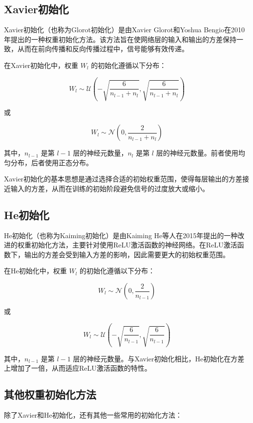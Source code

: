 \subsection{Xavier初始化}

Xavier初始化（也称为Glorot初始化）是由Xavier Glorot和Yoshua Bengio在2010年提出的一种权重初始化方法。该方法旨在使网络层的输入和输出的方差保持一致，从而在前向传播和反向传播过程中，信号能够有效传递。

在Xavier初始化中，权重 \( W_l \) 的初始化遵循以下分布：

\[ W_l \sim \mathcal{U}\left(-\sqrt{\frac{6}{n_{l-1} + n_l}}, \sqrt{\frac{6}{n_{l-1} + n_l}}\right) \]

或

\[ W_l \sim \mathcal{N}\left(0, \frac{2}{n_{l-1} + n_l}\right) \]

其中，\( n_{l-1} \) 是第 \( l-1 \) 层的神经元数量，\( n_l \) 是第 \( l \) 层的神经元数量。前者使用均匀分布，后者使用正态分布。

Xavier初始化的基本思想是通过选择合适的初始权重范围，使得每层输出的方差接近输入的方差，从而在训练的初始阶段避免信号的过度放大或缩小。

\subsection{He初始化}

He初始化（也称为Kaiming初始化）是由Kaiming He等人在2015年提出的一种改进的权重初始化方法，主要针对使用ReLU激活函数的神经网络。在ReLU激活函数下，输出的方差会受到输入方差的影响，因此需要更大的初始权重范围。

在He初始化中，权重 \( W_l \) 的初始化遵循以下分布：

\[ W_l \sim \mathcal{N}\left(0, \frac{2}{n_{l-1}}\right) \]

或

\[ W_l \sim \mathcal{U}\left(-\sqrt{\frac{6}{n_{l-1}}}, \sqrt{\frac{6}{n_{l-1}}}\right) \]

其中，\( n_{l-1} \) 是第 \( l-1 \) 层的神经元数量。与Xavier初始化相比，He初始化在方差上增加了一倍，从而适应ReLU激活函数的特性。

\subsection{其他权重初始化方法}

除了Xavier和He初始化，还有其他一些常用的初始化方法：

